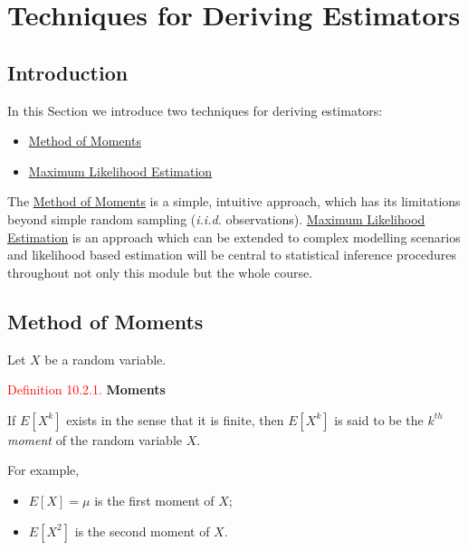 \documentclass[
]{book}
\providecommand{\tightlist}{%
  \setlength{\itemsep}{0pt}\setlength{\parskip}{0pt}}
\begin{document}
\hypertarget{MLE}{%
\chapter{Techniques for Deriving Estimators}\label{MLE}}

\hypertarget{MLE:intro}{%
\section{Introduction}\label{MLE:intro}}

In this Section we introduce two techniques for deriving estimators:

\begin{itemize}
\tightlist
\item
  \protect\hyperlink{MLE:moments}{Method of Moments}\\
\item
  \protect\hyperlink{MLE:MLE}{Maximum Likelihood Estimation}
\end{itemize}

The \protect\hyperlink{MLE:moments}{Method of Moments} is a simple, intuitive approach, which has its limitations beyond simple random sampling (\emph{i.i.d.} observations). \protect\hyperlink{MLE:MLE}{Maximum Likelihood Estimation} is an approach which can be extended to complex modelling scenarios and likelihood based estimation will be central to statistical inference procedures throughout not only this module but the whole course.

\hypertarget{MLE:moments}{%
\section{Method of Moments}\label{MLE:moments}}

Let \(X\) be a random variable.

\leavevmode{}%
\textcolor{red}{Definition 10.2.1.}
{\textbf{Moments}}

If \(E[X^k]\) exists in the sense that it is finite, then \(E[X^k]\) is said to be the \(k^{th}\) \emph{moment} of the random variable \(X\).

For example,

\begin{itemize}
\item
  \(E[X] = \mu\) is the first moment of \(X\);
\item
  \(E[X^2]\) is the second moment of \(X\).
\end{itemize}
\end{document}
